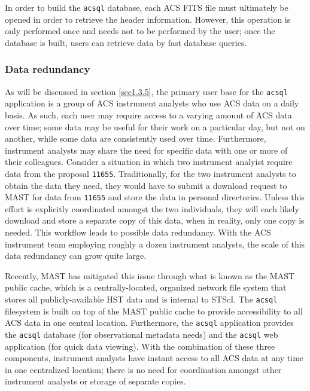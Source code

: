 \documentclass[10pt,journal,compsoc]{IEEEtran}
\begin{document}
In order to build the \texttt{acsql} database, each ACS FITS file must ultimately be opened in order to retrieve the header information.  However, this operation is only
performed once and needs not to be performed by the user; once the database is built, users can retrieve data by fast database queries.


\subsubsection{Data redundancy} \label{sec1.3.3}

As will be discussed in section \ref{sec1.3.5}, the primary user base for the \texttt{acsql} application is a group of ACS instrument analysts who use ACS data on a daily
basis.  As such, each user may require access to a varying amount of ACS data over time; some data may be useful for their work on a particular day, but not on another,
while some data are consistently used over time.  Furthermore, instrument analysts may share the need for specific data with one or more of their colleagues.
Consider a situation in which two instrument analyist require data from the proposal \texttt{11655}. Traditionally, for the two instrument analysts to obtain the data they
need, they would have to submit a download request to MAST for data from \texttt{11655} and store the data in personal directories.  Unless this effort is explicitly
coordinated amongst the two individuals, they will each likely download and store a separate copy of this data, when in reality, only one copy is needed.  This workflow leads to
possible data redundancy.  With the ACS instrument team employing roughly a dozen instrument analysts, the scale of this data redundancy can grow quite large.

Recently, MAST has mitigated this issue through what is known as the MAST public cache, which is a centrally-located, organized network file system that stores all
publicly-available HST data and is internal to STScI.  The \texttt{acsql} filesystem is built on top of the MAST public cache to provide accessibility to all ACS data in one
central location.  Furthermore, the \texttt{acsql} application provides the \texttt{acsql} database (for observational metadata needs) and the \texttt{acsql} web application
(for quick data viewing).  With the combination of these three components, instrument analysts have instant access to all ACS data at any time in one centralized location; there is
no need for coordination amongst other instrument analysts or storage of separate copies.
\end{document}
